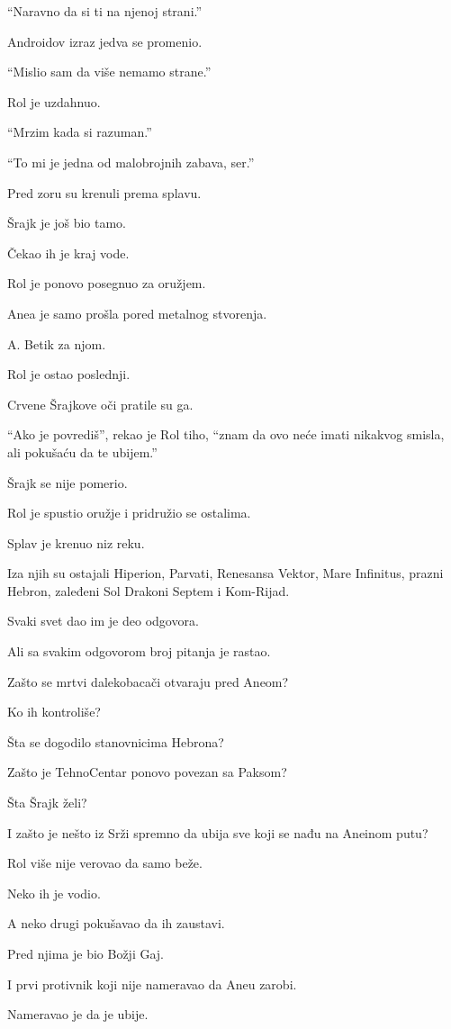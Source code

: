 ``Naravno da si ti na njenoj strani.''

Androidov izraz jedva se promenio.

``Mislio sam da više nemamo strane.''

\bigskip

Rol je uzdahnuo.

``Mrzim kada si razuman.''

``To mi je jedna od malobrojnih zabava, ser.''

\bigskip

Pred zoru su krenuli prema splavu.

Šrajk je još bio tamo.

Čekao ih je kraj vode.

\bigskip

Rol je ponovo posegnuo za oružjem.

Anea je samo prošla pored metalnog stvorenja.

A. Betik za njom.

Rol je ostao poslednji.

Crvene Šrajkove oči pratile su ga.

\bigskip

``Ako je povrediš'', rekao je Rol tiho, ``znam da ovo neće imati nikakvog smisla, ali pokušaću da te ubijem.''

Šrajk se nije pomerio.

\bigskip

Rol je spustio oružje i pridružio se ostalima.

\bigskip

Splav je krenuo niz reku.

Iza njih su ostajali Hiperion, Parvati, Renesansa Vektor, Mare Infinitus, prazni Hebron, zaleđeni Sol Drakoni Septem i Kom-Rijad.

Svaki svet dao im je deo odgovora.

Ali sa svakim odgovorom broj pitanja je rastao.

\bigskip

Zašto se mrtvi dalekobacači otvaraju pred Aneom?

Ko ih kontroliše?

Šta se dogodilo stanovnicima Hebrona?

Zašto je TehnoCentar ponovo povezan sa Paksom?

Šta Šrajk želi?

I zašto je nešto iz Srži spremno da ubija sve koji se nađu na Aneinom putu?

\bigskip

Rol više nije verovao da samo beže.

Neko ih je vodio.

A neko drugi pokušavao da ih zaustavi.

\bigskip

Pred njima je bio Božji Gaj.

I prvi protivnik koji nije nameravao da Aneu zarobi.

Nameravao je da je ubije.
